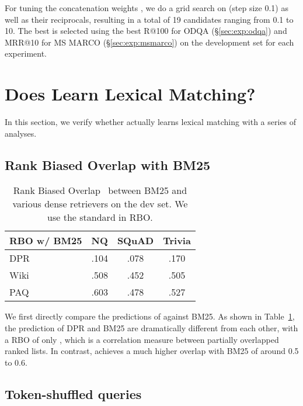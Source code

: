 \documentclass[11pt]{article}
\newcommand{\lexmodelsymbol}{\xspace}
\newcommand{\secref}[1]{\S\ref{#1}}
\begin{document}
For tuning the concatenation weights , we do a grid search on  (step size 0.1) as well as their reciprocals, resulting in a total of 19 candidates ranging from 0.1 to 10.
The best  is selected using the best R@100 for ODQA (\secref{sec:exp:odqa}) and MRR@10 for MS MARCO (\secref{sec:exp:msmarco}) on the development set for each experiment.

 
\section{Does \lexmodelsymbol{} Learn Lexical Matching?}\label{sec:discussion:lexical}
In this section, we verify whether \lexmodelsymbol{} actually learns lexical matching with a series of analyses.

\subsection{Rank Biased Overlap with BM25}\label{sec:discussion:overlap}

\begin{table}[ht]
    \small
    \centering
    \begin{tabular}{l ccc}
    \toprule
    RBO w/ BM25   & NQ & SQuAD & Trivia \\
    \midrule
    DPR             & .104 & .078 & .170 \\
    Wiki \lexmodelsymbol{} & .508 & .452 & .505 \\
    PAQ \lexmodelsymbol{} & .603 & .478 & .527 \\
    \bottomrule
    \end{tabular}
    \caption{Rank Biased Overlap~\citep[RBO,][]{rbo} between BM25 and various dense retrievers on the dev set. We use the standard  in RBO.}
    \label{tab:prediction_overlap}
\end{table}
 
We first directly compare the predictions of \lexmodelsymbol{} against BM25.
As shown in Table~\ref{tab:prediction_overlap}, the prediction of DPR and BM25 are dramatically different from each other, with a RBO of only , which is a correlation measure between partially overlapped ranked lists.
In contrast, \lexmodelsymbol{} achieves a much higher overlap with BM25 of around 0.5 to 0.6.

\subsection{Token-shuffled queries}\label{sec:discussion:shuffled}
\end{document}
